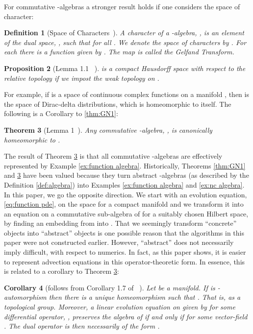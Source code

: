 \documentclass[final,leqno]{amsart}
\newtheorem{theorem}{Theorem}[section]
\newtheorem{definition}[theorem]{Definition}
\newtheorem{proposition}[theorem]{Proposition}
\newtheorem{corollary}[theorem]{Corollary}
\begin{document}
For commutative -algebras a stronger result holds if one considers the space of character:
\begin{definition}[Space of Characters~\cite{Bondia2001}]
	A \emph{character} of a -algebra, , is an element of the dual space, , such that  for all .  
	We denote the space of characters by .
	For each  there is a function  given by .
	The map  is called the \emph{Gelfand Transform}.
\end{definition}

\begin{proposition}[Lemma 1.1 ~\cite{Bondia2001}]
	 is a compact Hausdorff space with respect to the relative topology if we impost the weak topology on .
\end{proposition}


For example, if  is a space of continuous complex functions on a manifold , then  is the space of Dirac-delta distributions, which is homeomorphic to  itself.
The following is a Corollary to \ref{thm:GN1}:

\begin{theorem}[Lemma 1~\cite{GelfandNaimark1943}] \label{thm:GN2}
	Any commutative -algebra, , is canonically homeomorphic to .
\end{theorem}

The result of Theorem \ref{thm:GN2} is that all commutative -algebras are effectively represented by Example \ref{ex:function algebra}.
Historically, Theorems \ref{thm:GN1} and \ref{thm:GN2} have been valued because they turn abstract -algebras
(as described by the Definition \ref{def:algebra}) into Examples \ref{ex:function algebra} and \ref{ex:nc algebra}.
In this paper, we go the opposite direction.
We start with an evolution equation, \eqref{eq:function pde}, on the space  for a compact manifold  and we transform it into an equation on a commutative sub-algebra of 
for a suitably chosen Hilbert space,  by finding an embedding from  into .
That we seemingly transform ``concrete'' objects into ``abstract'' objects is one possible reason that the algorithms in this paper were not constructed earlier.
However, ``abstract'' does not necessarily imply difficult, with respect to numerics.
In fact, as this paper shows, it is easier to represent advection equations in this operator-theoretic form.
In essence, this is related to a corollary to Theorem \ref{thm:GN2}:

\begin{corollary}[follows from Corollary 1.7 of ~\cite{Bondia2001}]
	Let  be a manifold.
	If  is -automorphism then there is a unique homeomorphism  such that .
	That is,  as a topological group.
	Moreover, a linear evolution equation on  given by  for some differential operator, ,
	preserves  the algebra of  if and only if  for some vector-field .
	The dual operator is then necessarily of the form .
\end{corollary}
\end{document}
